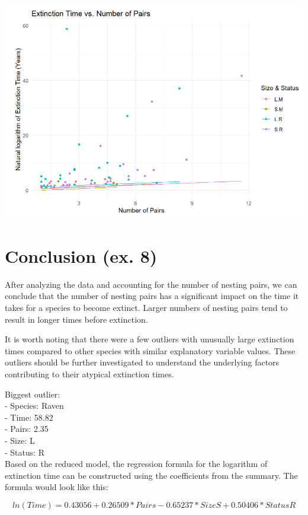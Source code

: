\documentclass{article}
\begin{document}
\begin{center}
\includegraphics[scale=0.5]{graphs/graph7.png}
\end{center}

\section{Conclusion (ex. 8)}

After analyzing the data and accounting for the number of nesting pairs,
we can conclude that the number of nesting pairs has a significant
impact on the time it takes for a species to become extinct. Larger
numbers of nesting pairs tend to result in longer times before
extinction.

It is worth noting that there were a few outliers with unusually
large extinction times compared to other species with similar
explanatory variable values. These outliers should be further
investigated to understand the underlying factors contributing to their
atypical extinction times.

Biggest outlier: \\
- Species: Raven \\
- Time: 58.82 \\
- Pairs: 2.35 \\
- Size: L \\ 
- Status: R \\

Based on the reduced model, the regression formula for the
logarithm of extinction time can be constructed using the coefficients
from the summary. The formula would look like this:

$$ln(Time) = 0.43056 + 0.26509 * Pairs - 0.65237 * SizeS + 0.50406 *
StatusR$$
\end{document}
